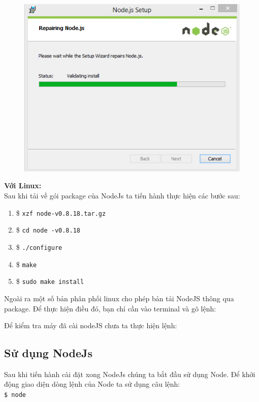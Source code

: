\documentclass[a4paper,12pt]{report}
\begin{document}
	\begin{figure}[-h]
		\includegraphics[scale=0.7]{2.PNG}
	\end{figure}

	\textbf{Với Linux:}\\
		 Sau khi tải về gói package của NodeJs ta tiến hành thực hiện các bước sau:\\
			\begin{enumerate}
				\item \$ \texttt{xzf node-v0.8.18.tar.gz}
				\item \$ \texttt{cd node -v0.8.18}
				\item \$ \texttt{./configure}
				\item \$ \texttt{make}
				\item \$ \texttt{sudo make install}
			\end{enumerate}
		 Ngoài ra một số bản phân phối linux cho phép bản tải NodeJS thông qua package. Để thực hiện điều đó, bạn chỉ cần vào terminal và gõ lệnh:\\

	Để kiểm tra máy đã cài nodeJS chưa ta thực hiện lệnh:\\

	\subsection{Sử dụng NodeJs}
Sau khi tiến hành cài đặt xong NodeJs chúng ta bắt đầu sử dụng Node. Để khởi động giao diện dòng lệnh của Node ta sử dụng câu lệnh: \\
	\texttt{\$ node}
\end{document}
